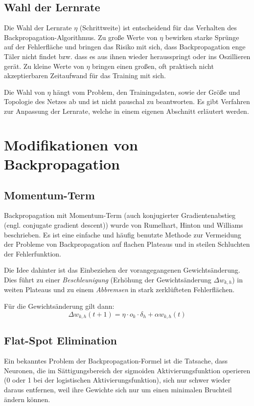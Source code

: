 \subsection*{Wahl der Lernrate}
Die Wahl der Lernrate $\eta$ (Schrittweite) ist entscheidend für das Verhalten des Backpropagation-Algorithmus. Zu große Werte von $\eta$ bewirken starke Sprünge auf der Fehlerfläche und bringen das Risiko mit sich, dass Backpropagation enge Täler nicht findet bzw. dass es aus ihnen wieder herausspringt oder ins Oszillieren gerät.
Zu kleine Werte von $\eta$ bringen einen großen, oft praktisch nicht akzeptierbaren Zeitaufwand für das Training mit sich.

Die Wahl von $\eta$ hängt vom Problem, den Trainingsdaten, sowie der Größe und Topologie des Netzes ab und ist nicht pauschal zu beantworten. Es gibt Verfahren zur Anpassung der Lernrate, welche in einem eigenen Abschnitt erläutert werden.



\section*{Modifikationen von Backpropagation}
\subsection*{Momentum-Term}
Backpropagation mit Momentum-Term (auch konjugierter Gradientenabstieg (engl. conjugate gradient descent)) wurde von Rumelhart, Hinton und Williams beschrieben.
Es ist eine einfache und häufig benutzte Methode zur Vermeidung der Probleme von Backpropagation auf flachen Plateaus und in steilen Schluchten der Fehlerfunktion. 

Die Idee dahinter ist das Einbeziehen der vorangegangenen Gewichtsänderung. Dies führt zu einer \emph{Beschleunigung} (Erhöhung der Gewichtsänderung $\Delta w_{k,h}$) in weiten Plateaus und zu einem \emph{Abbremsen} in stark zerklüfteten Fehlerflächen.

Für die Gewichtsänderung gilt dann:
\[
	\Delta w_{k,h} (t+1) = \eta \cdot o_k \cdot \delta_h + 
		\alpha w_{k,h}(t)
\]

\subsection*{Flat-Spot Elimination}
Ein bekanntes Problem der Backpropagation-Formel ist die Tatsache, dass Neuronen, die im Sättigungsbereich der sigmoiden Aktivierungsfunktion operieren (0 oder 1 bei der logistischen Aktivierungsfunktion), sich nur schwer wieder daraus entfernen, weil ihre Gewichte sich nur um einen minimalen Bruchteil ändern können.


